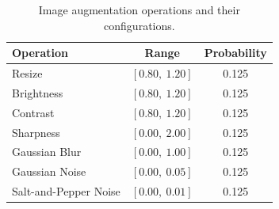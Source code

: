 
\begin{table}[!h]
\centering
\caption{Image augmentation operations and their configurations.}
\label{tab:aug_pipeline}
\small
\begin{tabular}{lcc}
\toprule
\textbf{Operation} & \textbf{Range} & \textbf{Probability} \\
\midrule
Resize     & $[0.80,\ 1.20]$ & 0.125 \\
Brightness & $[0.80,\ 1.20]$ & 0.125 \\
Contrast   & $[0.80,\ 1.20]$ & 0.125 \\
Sharpness  & $[0.00,\ 2.00]$ & 0.125 \\
Gaussian Blur & $[0.00,\ 1.00]$ & 0.125 \\
Gaussian Noise & $[0.00,\ 0.05]$ & 0.125 \\
Salt-and-Pepper Noise & $[0.00,\ 0.01]$ & 0.125 \\
\bottomrule
\end{tabular}
\end{table}

